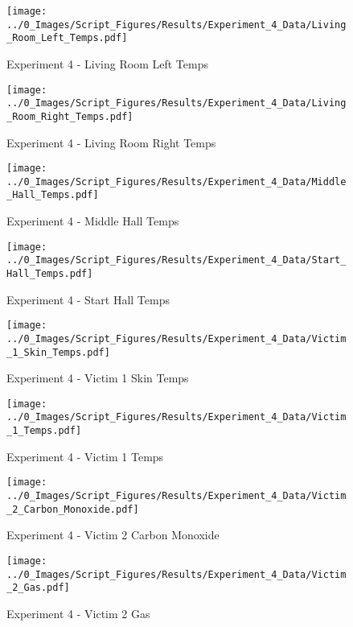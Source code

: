 	\begin{figure}[H]
		\centering
		\texttt{[image: ../0\_Images/Script\_Figures/Results/Experiment\_4\_Data/Living\_Room\_Left\_Temps.pdf]}
		\caption[]{Experiment 4 - Living Room Left Temps}
	\end{figure}
 
	\clearpage

	\begin{figure}[H]
		\centering
		\texttt{[image: ../0\_Images/Script\_Figures/Results/Experiment\_4\_Data/Living\_Room\_Right\_Temps.pdf]}
		\caption[]{Experiment 4 - Living Room Right Temps}
	\end{figure}
 

	\begin{figure}[H]
		\centering
		\texttt{[image: ../0\_Images/Script\_Figures/Results/Experiment\_4\_Data/Middle\_Hall\_Temps.pdf]}
		\caption[]{Experiment 4 - Middle Hall Temps}
	\end{figure}
 
	\clearpage

	\begin{figure}[H]
		\centering
		\texttt{[image: ../0\_Images/Script\_Figures/Results/Experiment\_4\_Data/Start\_Hall\_Temps.pdf]}
		\caption[]{Experiment 4 - Start Hall Temps}
	\end{figure}
 

	\begin{figure}[H]
		\centering
		\texttt{[image: ../0\_Images/Script\_Figures/Results/Experiment\_4\_Data/Victim\_1\_Skin\_Temps.pdf]}
		\caption[]{Experiment 4 - Victim 1 Skin Temps}
	\end{figure}
 
	\clearpage

	\begin{figure}[H]
		\centering
		\texttt{[image: ../0\_Images/Script\_Figures/Results/Experiment\_4\_Data/Victim\_1\_Temps.pdf]}
		\caption[]{Experiment 4 - Victim 1 Temps}
	\end{figure}
 

	\begin{figure}[H]
		\centering
		\texttt{[image: ../0\_Images/Script\_Figures/Results/Experiment\_4\_Data/Victim\_2\_Carbon\_Monoxide.pdf]}
		\caption[]{Experiment 4 - Victim 2 Carbon Monoxide}
	\end{figure}
 
	\clearpage

	\begin{figure}[H]
		\centering
		\texttt{[image: ../0\_Images/Script\_Figures/Results/Experiment\_4\_Data/Victim\_2\_Gas.pdf]}
		\caption[]{Experiment 4 - Victim 2 Gas}
	\end{figure}
 

